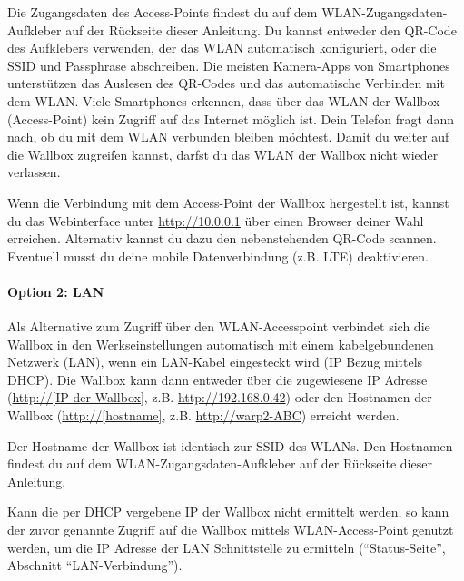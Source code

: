 \documentclass[a4paper,10pt]{article}
\begin{document}
\begin{multicols*}{2}
    Die Zugangsdaten des Access-Points findest du auf dem WLAN-Zugangsdaten-Aufkleber
    auf der Rückseite dieser Anleitung. Du kannst entweder den QR-Code des Aufklebers verwenden,
    der das WLAN automatisch konfiguriert, oder die SSID und Passphrase abschreiben.
    Die meisten Kamera-Apps von Smartphones unterstützen das Auslesen des
    QR-Codes und das automatische Verbinden mit dem WLAN. Viele Smartphones
    erkennen, dass über das WLAN der Wallbox (Access-Point) kein Zugriff auf das
    Internet möglich ist. Dein Telefon fragt dann nach, ob du mit dem WLAN
    verbunden bleiben möchtest. Damit du weiter auf die Wallbox zugreifen
    kannst, darfst du das WLAN der Wallbox nicht wieder verlassen.

    \begin{minipage}{0.35\textwidth}
        Wenn die Verbindung mit dem Access-Point der Wallbox hergestellt ist, kannst du das Webinterface
        unter \url{http://10.0.0.1} über einen Browser deiner Wahl erreichen.
        Alternativ kannst du dazu den nebenstehenden QR-Code scannen.
        Eventuell musst du deine mobile Datenverbindung (z.B. LTE) deaktivieren.
    \end{minipage}\hfill
    \begin{minipage}{0.12\textwidth}
        \begin{flushright}
        \end{flushright}
    \end{minipage}

    \paragraph{Option 2: LAN}
    Als Alternative zum Zugriff über den WLAN-Accesspoint verbindet sich die
    Wallbox in den Werkseinstellungen automatisch mit einem
    kabelgebundenen Netzwerk (LAN), wenn ein LAN-Kabel eingesteckt wird (IP Bezug
    mittels DHCP). Die Wallbox kann dann entweder über die zugewiesene IP
    Adresse (\url{http://[IP-der-Wallbox]}, z.B. \url{http://192.168.0.42})
    oder den Hostnamen der Wallbox (\url{http://[hostname]}, z.B.
    \url{http://warp2-ABC}) erreicht werden.

    Der Hostname der Wallbox ist identisch zur SSID des WLANs. Den Hostnamen findest du
    auf dem WLAN-Zugangsdaten-Aufkleber auf der Rückseite dieser Anleitung.

    Kann die per DHCP vergebene IP der Wallbox nicht ermittelt werden, so kann der
    zuvor genannte Zugriff auf die Wallbox mittels WLAN-Access-Point genutzt
    werden, um die IP Adresse der LAN Schnittstelle zu ermitteln (\enquote{Status-Seite},
    Abschnitt \enquote{LAN-Verbindung}).


\end{multicols*}
\end{document}
